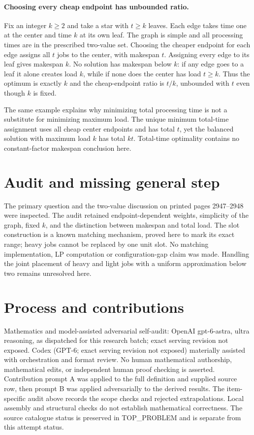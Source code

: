 \documentclass[11pt]{article}
\begin{document}
\paragraph{Choosing every cheap endpoint has unbounded ratio.}
Fix an integer $k\ge2$ and take a star with $t\ge k$
leaves. Each edge takes time one at the center and time $k$
at its own leaf. The graph is simple and all processing times
are in the prescribed two-value set. Choosing the cheaper endpoint
for each edge assigns all $t$ jobs to the center, with makespan
$t$. Assigning every edge to its leaf gives makespan $k$.
No solution has makespan below $k$: if any edge goes to a
leaf it alone creates load $k$, while if none does the center
has load $t\ge k$. Thus the optimum is exactly $k$ and
the cheap-endpoint ratio is $t/k$, unbounded with $t$ even
though $k$ is fixed.

The same example explains why minimizing total processing time is
not a substitute for minimizing maximum load. The unique minimum
total-time assignment uses all cheap center endpoints and has total
$t$, yet the balanced solution with maximum load $k$ has
total $kt$. Total-time optimality contains no constant-factor
makespan conclusion here.

\section{Audit and missing general step}
The primary question and the two-value discussion on printed pages
2947--2948 were inspected. The audit retained endpoint-dependent
weights, simplicity of the graph, fixed $k$, and the distinction
between makespan and total load. The slot construction is a
known matching mechanism, proved here to mark its exact range;
heavy jobs cannot be replaced by one unit slot. No matching
implementation, LP computation or configuration-gap claim was made.
Handling the joint placement of heavy and light jobs with a
uniform approximation below two remains unresolved here.

\section{Process and contributions}
Mathematics and model-assisted adversarial self-audit: OpenAI gpt-6-astra, ultra reasoning, as dispatched for this research batch; exact serving revision not exposed. Codex (GPT-6; exact serving revision not exposed) materially assisted with orchestration and format review. No human mathematical authorship, mathematical edits, or independent human proof checking is asserted.
Contribution prompt A was applied to the full definition and supplied source row, then prompt B was applied adversarially to the derived results. The item-specific audit above records the scope checks and rejected extrapolations. Local assembly and structural checks do not establish mathematical correctness. The source catalogue status is preserved in TOP\_PROBLEM and is separate from this attempt status.
\end{document}
